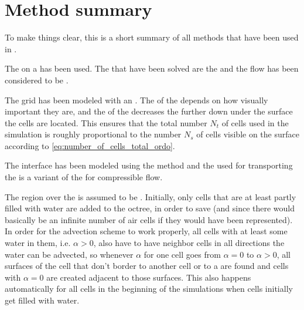 \chapter{Method summary}

To make things clear, this is a short summary of all methods that have been used in \thisprojectwork.

The \FVM on a  has been used. The \PDEs that have been solved are the  and the flow has been considered to be .

The grid has been modeled with an \octree. The \LOD of the  depends on how visually important they are, and the \LOD of the  decreases the further down under the surface the cells are located. This ensures that the total number $N_t$ of cells used in the simulation is roughly proportional to the number $N_s$ of cells visible on the surface according to \eqref{eq:number_of_cells_total_ordo}.

The interface has been modeled using the \VOF method and the  used for transporting the  is a variant of the  for compressible flow.

The region over the  is assumed to be \air. Initially, only cells that are at least partly filled with water are added to the octree, in order to save  (and since there would basically be an infinite number of air cells if they would have been represented). In order for the advection scheme to work properly, all cells with at least some water in them, i.e. $\alpha > 0$, also have to have neighbor cells in all directions the water can be advected, so whenever $\alpha$ for one cell goes from $\alpha = 0$ to $\alpha > 0$, all surfaces of the cell that don't border to another cell or to a  are found and cells with $\alpha = 0$ are created adjacent to those surfaces. This also happens automatically for all cells in the beginning of the simulations when cells initially get filled with water.
